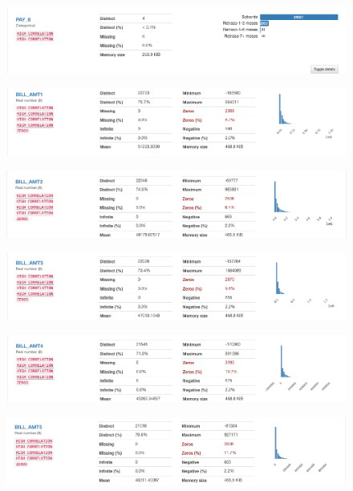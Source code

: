 \begin{figure}[H]
	\centering
	\includegraphics[scale=0.4]{Images/13}
\end{figure}
\begin{figure}[H]
	\centering
	\includegraphics[scale=0.4]{Images/14}
\end{figure}
\begin{figure}[H]
	\centering
	\includegraphics[scale=0.4]{Images/15}
\end{figure}
\begin{figure}[H]
	\centering
	\includegraphics[scale=0.4]{Images/16}
\end{figure}
\begin{figure}[H]
	\centering
	\includegraphics[scale=0.4]{Images/17}
\end{figure}
\begin{figure}[H]
	\centering
	\includegraphics[scale=0.4]{Images/18}
\end{figure}

